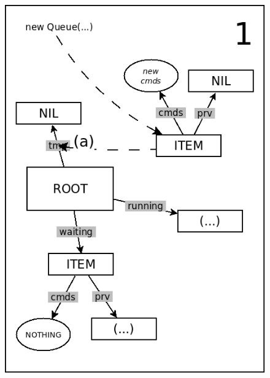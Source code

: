 \documentclass{sig-alternate}
\begin{document}
\begin{figure}
\begin{minipage}[t]{0.24\linewidth}
\includegraphics[scale=0.25]{queue-21.png}
\end{minipage}
\begin{minipage}[t]{0.24\linewidth}
\centering

\end{minipage}
\end{figure}
\end{document}
